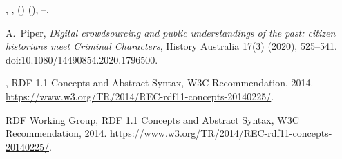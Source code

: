 \documentclass[ds,v1.1.2,openaccess]{iosart2x}%
\begin{document}
\begin{thebibliography}{}
%
\begin{barticle}
,
,
()
(),
--.
\end{barticle}
%
\OrigBibText
A.~Piper,
\textit{Digital crowdsourcing and public understandings of the past: citizen
historians meet Criminal Characters},
History Australia
17(3)
(2020),
525--541.
doi:10.1080/14490854.2020.1796500.
\endOrigBibText
{}
\endbibitem

%
\begin{botherref}
,
{RDF} 1.1 Concepts and Abstract Syntax, {W3C} Recommendation,
2014.
\url{https://www.w3.org/TR/2014/REC-rdf11-concepts-20140225/}.
\end{botherref}
%
\OrigBibText
{RDF Working Group},
{RDF} 1.1 Concepts and Abstract Syntax,
{W3C} Recommendation,
2014.
\url{https://www.w3.org/TR/2014/REC-rdf11-concepts-20140225/}.
\endOrigBibText
{}
\endbibitem


\end{thebibliography}
\end{document}
